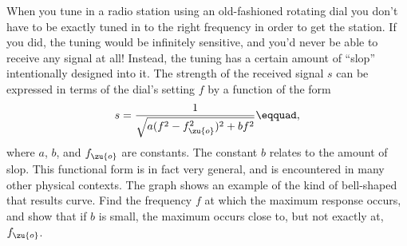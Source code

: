 When you tune in a radio station using an old-fashioned rotating dial you don't have to be
exactly tuned in to the right frequency in order to get the station. If you did, the
tuning would be infinitely sensitive, and you'd never be able to receive any signal at
all! Instead, the tuning has a certain amount of ``slop'' intentionally designed into it.
The strength of the received signal $s$ can be expressed in terms of the dial's setting
$f$ by a function of the form
\begin{equation*}
  s = \frac{1}{\sqrt{a(f^2-f_\zu{o}^2)^2+bf^2}}\eqquad,
\end{equation*}
where $a$, $b$, and $f_\zu{o}$ are constants. The constant $b$ relates to the amount of slop.
This functional form is in fact very general, and
is encountered in many other physical contexts. The graph  shows an example of the kind of
bell-shaped that results curve.
Find the frequency $f$ at which the maximum response occurs, and show that if $b$ is small,
the maximum occurs close to, but not exactly at, $f_\zu{o}$.
